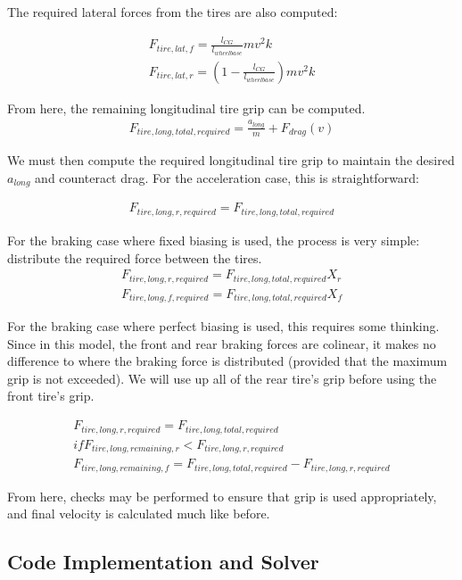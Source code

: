 \documentclass{article}
\begin{document}
The required lateral forces from the tires are also computed:

\begin{align}
	F_{tire,lat,f} = \frac{l_{CG}}{l_{wheelbase}} m v^2 k \\ 
	F_{tire,lat,r} = (1-\frac{l_{CG}}{l_{wheelbase}}) m v^2 k
\end{align}

From here, the remaining longitudinal tire grip can be computed.
\begin{align}
	F_{tire,long,total,required} = \frac{a_{long}}{m} + F_{drag}(v)
\end{align}

We must then compute the required longitudinal tire grip to maintain the desired $a_{long}$ and counteract drag. For the acceleration case, this is straightforward:

\begin{align}
	F_{tire,long,r,required} = F_{tire,long,total,required}
\end{align}

For the braking case where fixed biasing is used, the process is very simple: distribute the required force between the tires.
\begin{align}
	F_{tire,long,r,required} = F_{tire,long,total,required} X_r \\
	F_{tire,long,f,required} = F_{tire,long,total,required} X_f
\end{align}

For the braking case where perfect biasing is used, this requires some thinking. Since in this model, the front and rear braking forces are colinear, it makes no difference to where the braking force is distributed (provided that the maximum grip is not exceeded). We will use up all of the rear tire's grip before using the front tire's grip.

\begin{align}
	F_{tire,long,r,required} = F_{tire,long,total,required} \\
	if F_{tire,long,remaining,r} < F_{tire,long,r,required} \\
		F_{tire,long,remaining,f} = F_{tire,long,total,required} - F_{tire,long,r,required}
\end{align}

From here, checks may be performed to ensure that grip is used appropriately, and final velocity is calculated much like before.

\subsection{Code Implementation and Solver}
\end{document}
